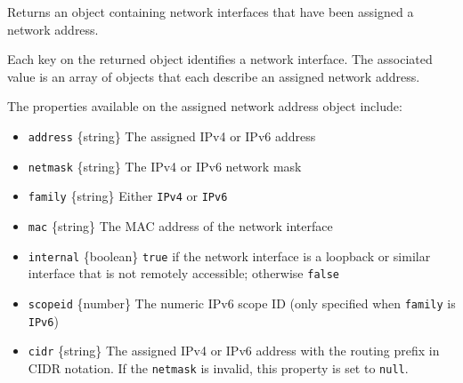 Returns an object containing network interfaces that have been assigned
a network address.

Each key on the returned object identifies a network interface. The
associated value is an array of objects that each describe an assigned
network address.

The properties available on the assigned network address object include:

\begin{itemize}
\tightlist
\item
  \texttt{address} \{string\} The assigned IPv4 or IPv6 address
\item
  \texttt{netmask} \{string\} The IPv4 or IPv6 network mask
\item
  \texttt{family} \{string\} Either \texttt{IPv4} or \texttt{IPv6}
\item
  \texttt{mac} \{string\} The MAC address of the network interface
\item
  \texttt{internal} \{boolean\} \texttt{true} if the network interface
  is a loopback or similar interface that is not remotely accessible;
  otherwise \texttt{false}
\item
  \texttt{scopeid} \{number\} The numeric IPv6 scope ID (only specified
  when \texttt{family} is \texttt{IPv6})
\item
  \texttt{cidr} \{string\} The assigned IPv4 or IPv6 address with the
  routing prefix in CIDR notation. If the \texttt{netmask} is invalid,
  this property is set to \texttt{null}.
\end{itemize}

